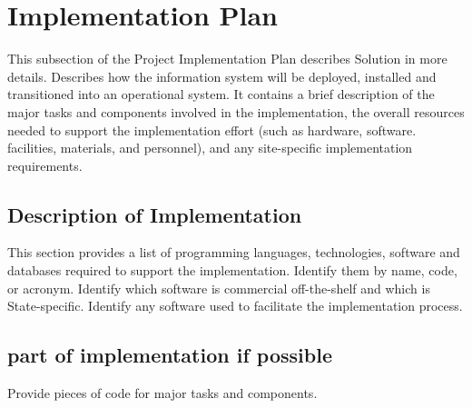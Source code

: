 \chapter{Implementation Plan}

This subsection of the Project Implementation Plan describes Solution in more details. Describes how the information system will be deployed, installed and transitioned into an operational system. It contains a brief description of the major tasks and components involved in the implementation, the overall resources needed to support the implementation effort (such as hardware, software. facilities, materials, and personnel), and any site-specific implementation requirements. 

\section{Description of Implementation}

This section provides a list of programming languages, technologies, software and databases required to support the implementation. Identify them by name, code, or acronym. Identify which software is commercial off-the-shelf and which is State-specific. Identify any software used to facilitate the implementation process.

\section{part of implementation if possible}

Provide pieces of code for major tasks and components.
